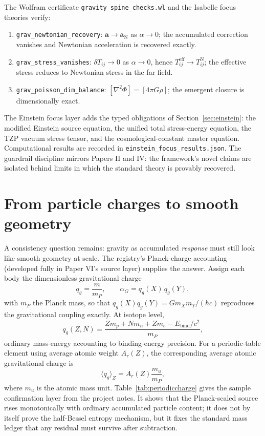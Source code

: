 \documentclass[11pt]{article}
\theoremstyle{remark}
\begin{document}
The Wolfram certificate \texttt{gravity\_spine\_checks.wl} and the Isabelle focus theories verify:
\begin{enumerate}
\item \texttt{grav\_newtonian\_recovery}: $\mathbf{a} \to \mathbf{a}_{\mathrm{N}}$ as $\alpha \to 0$; the accumulated correction vanishes and Newtonian acceleration is recovered exactly.
\item \texttt{grav\_stress\_vanishes}: $\delta T_{ij} \to 0$ as $\alpha \to 0$, hence $T^{\mathrm{eff}}_{ij} \to T^{\mathrm{N}}_{ij}$; the effective stress reduces to Newtonian stress in the far field.
\item \texttt{grav\_poisson\_dim\_balance}: $[\nabla^2\Phi] = [4\pi G\rho]$; the emergent closure is dimensionally exact.
\end{enumerate}
The Einstein focus layer adds the typed obligations of Section~\ref{sec:einstein}: the modified Einstein source equation, the unified total stress-energy equation, the TZP vacuum stress tensor, and the cosmological-constant master equation. Computational results are recorded in \texttt{einstein\_focus\_results.json}. The guardrail discipline mirrors Papers II and IV: the framework's novel claims are isolated behind limits in which the standard theory is provably recovered.

\section{From particle charges to smooth geometry}
\label{sec:largenumber}

A consistency question remains: gravity as accumulated \emph{response} must still look like smooth geometry at scale. The registry's Planck-charge accounting (developed fully in Paper VI's source layer) supplies the answer. Assign each body the dimensionless gravitational charge
\begin{equation}
q_g = \frac{m}{m_P}, \qquad \alpha_G = q_g(X)\, q_g(Y),
\label{eq:planckcharge}
\end{equation}
with $m_P$ the Planck mass, so that $q_g(X) q_g(Y) = G m_X m_Y / (\hbar c)$ reproduces the gravitational coupling exactly. At isotope level,
\begin{equation}
q_g(Z,N) =
\frac{Z m_p + N m_n + Z m_e - E_{\mathrm{bind}}/c^2}{m_P},
\label{eq:isotopecharge}
\end{equation}
ordinary mass-energy accounting to binding-energy precision. For a periodic-table element using average atomic weight $A_r(Z)$, the corresponding average atomic gravitational charge is
\begin{equation}
\langle q_g\rangle_Z = A_r(Z)\frac{m_u}{m_P},
\label{eq:periodiccharge}
\end{equation}
where $m_u$ is the atomic mass unit. Table~\ref{tab:periodiccharge} gives the sample confirmation layer from the project notes. It shows that the Planck-scaled source rises monotonically with ordinary accumulated particle content; it does not by itself prove the half-Bessel entropy mechanism, but it fixes the standard mass ledger that any residual must survive after subtraction.
\end{document}
